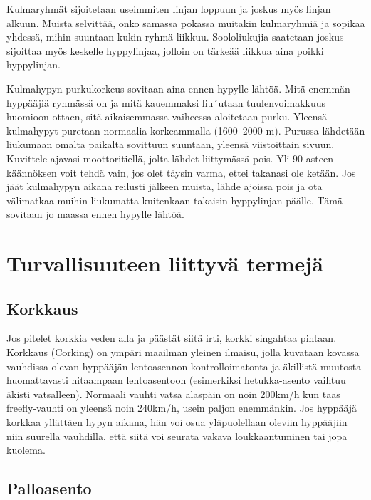 Kulmaryhmät sijoitetaan useimmiten linjan loppuun ja joskus myös linjan alkuun. Muista selvittää, onko samassa pokassa muitakin kulmaryhmiä ja sopikaa yhdessä, mihin suuntaan kukin ryhmä liikkuu. Soololiukujia saatetaan joskus sijoittaa myös keskelle hyppylinjaa, jolloin on tärkeää liikkua aina poikki hyppylinjan. 


Kulmahypyn purkukorkeus sovitaan aina ennen hypylle lähtöä. Mitä enemmän hyppääjiä ryhmässä on ja mitä kauemmaksi liu´utaan tuulenvoimakkuus huomioon ottaen, sitä aikaisemmassa vaiheessa aloitetaan purku. Yleensä kulmahypyt puretaan normaalia korkeammalla (1600–2000 m). Purussa lähdetään liukumaan omalta paikalta sovittuun suuntaan, yleensä viistoittain sivuun. Kuvittele ajavasi moottoritiellä, jolta lähdet liittymässä pois. Yli 90 asteen käännöksen voit tehdä vain, jos olet täysin varma, ettei takanasi ole ketään. Jos jäät kulmahypyn aikana reilusti jälkeen muista, lähde ajoissa pois ja ota välimatkaa muihin liukumatta kuitenkaan takaisin hyppylinjan päälle. Tämä sovitaan jo maassa ennen hypylle lähtöä. 

\section{ Turvallisuuteen liittyvä termejä }
\label{turvallisuus-freehyppaamisessa-turvallisuuteen-liittyva-termeja}

\subsection{ Korkkaus }
\label{turvallisuus-freehyppaamisessa-korkkaus}


Jos pitelet korkkia veden alla ja päästät siitä irti, korkki singahtaa pintaan. Korkkaus (Corking) on ympäri maailman yleinen ilmaisu, jolla kuvataan kovassa vauhdissa olevan hyppääjän lentoasennon kontrolloimatonta ja äkillistä muutosta huomattavasti hitaampaan lentoasentoon (esimerkiksi hetukka-asento vaihtuu äkisti vatsalleen). Normaali vauhti vatsa alaspäin on noin 200km/h kun taas freefly-vauhti on yleensä noin 240km/h, usein paljon enemmänkin. Jos hyppääjä korkkaa yllättäen hypyn aikana, hän voi osua yläpuolellaan oleviin hyppääjiin niin suurella vauhdilla, että siitä voi seurata vakava loukkaantuminen tai jopa kuolema. 

\subsection{ Palloasento }
\label{turvallisuus-freehyppaamisessa-palloasento}


